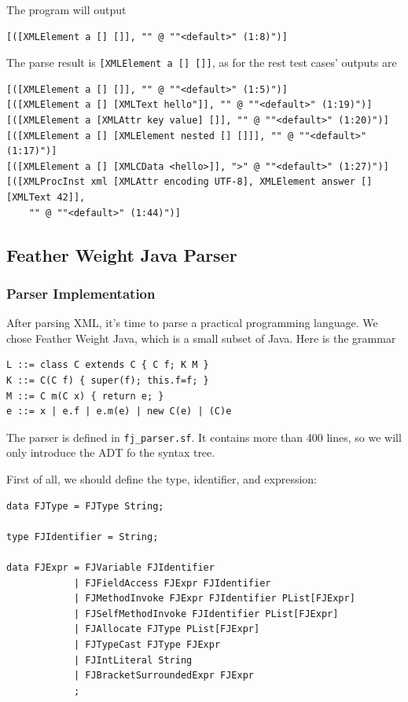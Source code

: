 The program will output

\begin{lstlisting}
[([XMLElement a [] []], "" @ ""<default>" (1:8)")]
\end{lstlisting}

The parse result is \texttt{[XMLElement a [] []]}, as for the rest test cases' outputs are

\begin{lstlisting}
[([XMLElement a [] []], "" @ ""<default>" (1:5)")]
[([XMLElement a [] [XMLText hello"]], "" @ ""<default>" (1:19)")]
[([XMLElement a [XMLAttr key value] []], "" @ ""<default>" (1:20)")]
[([XMLElement a [] [XMLElement nested [] []]], "" @ ""<default>" (1:17)")]
[([XMLElement a [] [XMLCData <hello>]], ">" @ ""<default>" (1:27)")]
[([XMLProcInst xml [XMLAttr encoding UTF-8], XMLElement answer [] [XMLText 42]],
    "" @ ""<default>" (1:44)")]
\end{lstlisting}

\subsection{Feather Weight Java Parser} \label{section:fj_parser}

\subsubsection{Parser Implementation}

After parsing XML, it's time to parse a practical programming language. We chose Feather Weight Java, which is a small subset of Java. Here is the grammar

\begin{lstlisting}[language={}]
L ::= class C extends C { C f; K M }
K ::= C(C f) { super(f); this.f=f; }
M ::= C m(C x) { return e; }
e ::= x | e.f | e.m(e) | new C(e) | (C)e
\end{lstlisting}

The parser is defined in \texttt{fj\_parser.sf}. It contains more than 400 lines, so we will only introduce the ADT fo the syntax tree.

First of all, we should define the type, identifier, and expression:

\begin{lstlisting}
data FJType = FJType String;

type FJIdentifier = String;

data FJExpr = FJVariable FJIdentifier
            | FJFieldAccess FJExpr FJIdentifier
            | FJMethodInvoke FJExpr FJIdentifier PList[FJExpr]
            | FJSelfMethodInvoke FJIdentifier PList[FJExpr]
            | FJAllocate FJType PList[FJExpr]
            | FJTypeCast FJType FJExpr
            | FJIntLiteral String
            | FJBracketSurroundedExpr FJExpr
            ;
\end{lstlisting}

